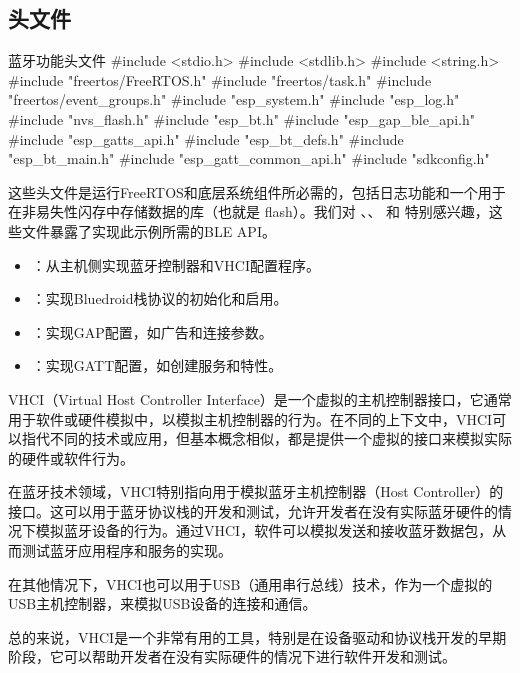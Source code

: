 \documentclass[lang=cn,newtx,10pt,scheme=chinese]{elegantbook}
\begin{document}
\subsection{头文件}

\begin{mycode}{蓝牙功能头文件}
#include <stdio.h>
#include <stdlib.h>
#include <string.h>
#include "freertos/FreeRTOS.h"
#include "freertos/task.h"
#include "freertos/event_groups.h"
#include "esp_system.h"
#include "esp_log.h"
#include "nvs_flash.h"
#include "esp_bt.h"
#include "esp_gap_ble_api.h"
#include "esp_gatts_api.h"
#include "esp_bt_defs.h"
#include "esp_bt_main.h"
#include "esp_gatt_common_api.h"
#include "sdkconfig.h"
\end{mycode}

这些头文件是运行FreeRTOS和底层系统组件所必需的，包括日志功能和一个用于在非易失性闪存中存储数据的库（也就是 flash）。我们对 、、 和  特别感兴趣，这些文件暴露了实现此示例所需的BLE API。

\begin{itemize}
\item {}：从主机侧实现蓝牙控制器和VHCI配置程序。
\item {}：实现Bluedroid栈协议的初始化和启用。
\item {}：实现GAP配置，如广告和连接参数。
\item {}：实现GATT配置，如创建服务和特性。
\end{itemize}

\begin{marker}
VHCI（Virtual Host Controller Interface）是一个虚拟的主机控制器接口，它通常用于软件或硬件模拟中，以模拟主机控制器的行为。在不同的上下文中，VHCI可以指代不同的技术或应用，但基本概念相似，都是提供一个虚拟的接口来模拟实际的硬件或软件行为。

在蓝牙技术领域，VHCI特别指向用于模拟蓝牙主机控制器（Host Controller）的接口。这可以用于蓝牙协议栈的开发和测试，允许开发者在没有实际蓝牙硬件的情况下模拟蓝牙设备的行为。通过VHCI，软件可以模拟发送和接收蓝牙数据包，从而测试蓝牙应用程序和服务的实现。

在其他情况下，VHCI也可以用于USB（通用串行总线）技术，作为一个虚拟的USB主机控制器，来模拟USB设备的连接和通信。

总的来说，VHCI是一个非常有用的工具，特别是在设备驱动和协议栈开发的早期阶段，它可以帮助开发者在没有实际硬件的情况下进行软件开发和测试。
\end{marker}
\end{document}
